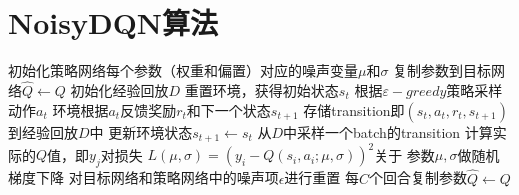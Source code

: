 \documentclass[11pt]{ctexart}
\begin{document}
\section{NoisyDQN算法}
\begin{algorithm}[H] %
    \renewcommand{\thealgorithm}{} %
	\caption{} 
    \renewcommand{\algorithmicrequire}{\textbf{输入:}}  
    \renewcommand{\algorithmicensure}{\textbf{输出:}} 
	\begin{algorithmic}[1]
		\STATE 初始化策略网络每个参数（权重和偏置）对应的噪声变量$\mu$和$\sigma$ %
		\STATE 复制参数到目标网络$\hat{Q} \leftarrow Q$
		\STATE 初始化经验回放$D$
			\STATE 重置环境，获得初始状态$s_t$
				\STATE 根据$\varepsilon-greedy$策略采样动作$a_t$
				\STATE 环境根据$a_t$反馈奖励$r_t$和下一个状态$s_{t+1}$
				\STATE 存储transition即$(s_t,a_t,r_t,s_{t+1})$到经验回放$D$中
				\STATE 更新环境状态$s_{t+1} \leftarrow s_t$
				\STATE 从$D$中采样一个batch的transition
				\STATE 计算实际的$Q$值，即$y_{j}$\footnotemark[2]
				\STATE 对损失 $L(\mu, \sigma)=\left(y_{i}-Q\left(s_{i}, a_{i} ; \mu, \sigma\right)\right)^{2}$关于
				参数$\mu, \sigma$做随机梯度下降
				\STATE 对目标网络和策略网络中的噪声项$\epsilon$进行重置
			\ENDFOR
			\STATE 每$C$个回合复制参数$\hat{Q}\leftarrow Q$\footnotemark[3]
		\ENDFOR
	\end{algorithmic}
\end{algorithm}
\clearpage
\end{document}
